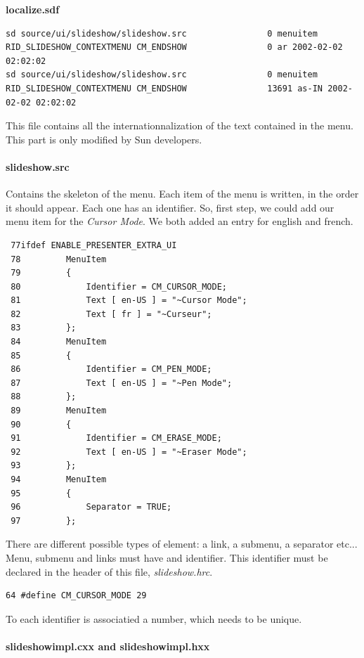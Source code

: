 \documentclass[a4paper,11pt]{article}
\begin{document}
\textbf{localize.sdf}

\begin{verbatim}
sd source/ui/slideshow/slideshow.src                0 menuitem
RID_SLIDESHOW_CONTEXTMENU CM_ENDSHOW                0 ar 2002-02-02 02:02:02
sd source/ui/slideshow/slideshow.src                0 menuitem
RID_SLIDESHOW_CONTEXTMENU CM_ENDSHOW                13691 as-IN 2002-02-02 02:02:02
\end{verbatim}

This file contains all the internationnalization of the text contained in the menu. This part is only modified by Sun developers.

\paragraph*{slideshow.src} Contains the skeleton of the menu. Each item of the menu is written, in the order it should appear. Each one has an identifier. So, first step, we could add our menu item for the \emph{Cursor Mode}. We both added an entry for english and french.

\begin{verbatim}
 77ifdef ENABLE_PRESENTER_EXTRA_UI
 78         MenuItem
 79         {
 80             Identifier = CM_CURSOR_MODE;
 81             Text [ en-US ] = "~Cursor Mode";
 82             Text [ fr ] = "~Curseur";
 83         };
 84         MenuItem
 85         {
 86             Identifier = CM_PEN_MODE;
 87             Text [ en-US ] = "~Pen Mode";
 88         };
 89         MenuItem
 90         {
 91             Identifier = CM_ERASE_MODE;
 92             Text [ en-US ] = "~Eraser Mode";
 93         };
 94         MenuItem
 95         {
 96             Separator = TRUE;
 97         };
\end{verbatim}

    There are different possible types of element: a link, a submenu, a separator etc... Menu,
submenu and links must have and identifier. This identifier must be declared in the header of this
file, \emph{slideshow.hrc}.

\begin{verbatim}
64 #define CM_CURSOR_MODE 29
\end{verbatim}

To each identifier is associatied a number, which needs to be unique.

\paragraph*{slideshowimpl.cxx and slideshowimpl.hxx}
\end{document}

